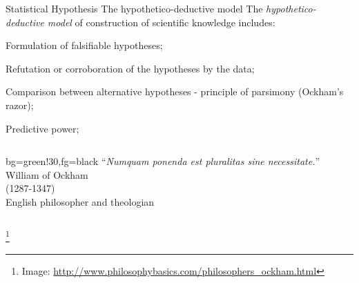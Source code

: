 \documentclass[t]{beamer}
\begin{document}

\begin{ftst}
{Statistical Hypothesis}
{The hypothetico-deductive model}
The \textit{hypothetico-deductive model} of construction of scientific knowledge includes:

\bitems Formulation of falsifiable hypotheses;
	\item Refutation or corroboration of the hypotheses by the data;
	\item Comparison between alternative hypotheses - principle of parsimony (Ockham's razor);
	\item Predictive power;
\eitem

\begin{columns}[T]
    \vhalf
	\begin{colorblock}{}{bg=green!30,fg=black}
	``\textit{Numquam ponenda est pluralitas sine necessitate.}''\\
	\flushright\vspace{-1em}\small William of Ockham\\
	\flushright\vspace{-1em}\small (1287-1347)\\
	\flushright\vspace{-1em}\small English philosopher and theologian\\
	\end{colorblock}
\end{columns}
\let\thefootnote\relax\footnote{\tiny Image: \url{http://www.philosophybasics.com/philosophers_ockham.html}}
\end{ftst}
\end{document}
